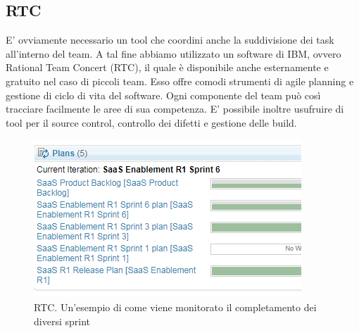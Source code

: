\subsection{RTC}
E' ovviamente necessario un tool che coordini anche la suddivisione dei task all'interno del team. A tal fine abbiamo utilizzato un software di IBM, ovvero Rational Team Concert (RTC), il quale è disponibile anche esternamente e gratuito nel caso di piccoli team. Esso offre comodi strumenti di agile planning e gestione di ciclo di vita del software. Ogni componente del team può così tracciare facilmente le aree di sua competenza. E' possibile inoltre usufruire di tool per il source control, controllo dei difetti e gestione delle build.
\begin{figure}[h]
	\centering
	\includegraphics[width=0.5\linewidth]{capitoli/imgs/rtc2}
	\caption{RTC. Un'esempio di come viene monitorato il completamento dei diversi sprint}
	\label{fig:rtc2}
\end{figure}



